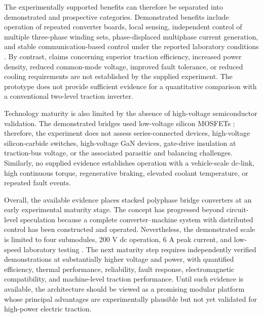 The experimentally supported benefits can therefore be separated into demonstrated and prospective categories. Demonstrated benefits include operation of repeated converter boards, local sensing, independent control of multiple three-phase winding sets, phase-displaced multiphase current generation, and stable communication-based control under the reported laboratory conditions \cite{Jin2017}. By contrast, claims concerning superior traction efficiency, increased power density, reduced common-mode voltage, improved fault tolerance, or reduced cooling requirements are not established by the supplied experiment. The prototype does not provide sufficient evidence for a quantitative comparison with a conventional two-level traction inverter. %

Technology maturity is also limited by the absence of high-voltage semiconductor validation. The demonstrated bridges used low-voltage silicon MOSFETs \cite{Jin2017}; therefore, the experiment does not assess series-connected devices, high-voltage silicon-carbide switches, high-voltage GaN devices, gate-drive insulation at traction-bus voltage, or the associated parasitic and balancing challenges. Similarly, no supplied evidence establishes operation with a vehicle-scale dc-link, high continuous torque, regenerative braking, elevated coolant temperature, or repeated fault events. %

Overall, the available evidence places stacked polyphase bridge converters at an early experimental maturity stage. The concept has progressed beyond circuit-level speculation because a complete converter--machine system with distributed control has been constructed and operated. Nevertheless, the demonstrated scale is limited to four submodules, 200 V dc operation, 6 A peak current, and low-speed laboratory testing \cite{Jin2017}. The next maturity step requires independently verified demonstrations at substantially higher voltage and power, with quantified efficiency, thermal performance, reliability, fault response, electromagnetic compatibility, and machine-level traction performance. Until such evidence is available, the architecture should be viewed as a promising modular platform whose principal advantages are experimentally plausible but not yet validated for high-power electric traction.
